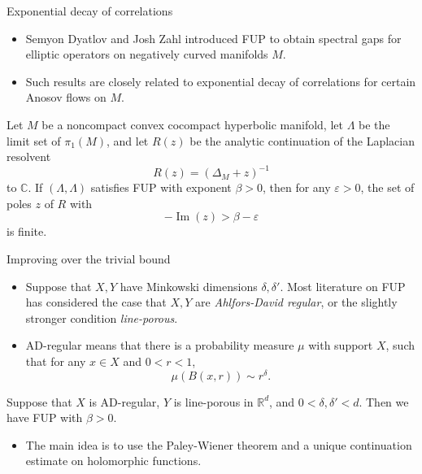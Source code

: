 \documentclass[10pt]{beamer}
\newcommand{\RR}{\mathbb{R}}
\newcommand{\CC}{\mathbb{C}}
\renewcommand{\Im}{\operatorname{Im}}
\begin{document}
\begin{frame}{Exponential decay of correlations}
\begin{itemize}
\item Semyon Dyatlov and Josh Zahl introduced FUP to obtain spectral gaps for elliptic operators on negatively curved manifolds $M$. \pause
\item Such results are closely related to exponential decay of correlations for certain Anosov flows on $M$. \pause
\end{itemize}

\begin{theorem}
Let $M$ be a noncompact convex cocompact hyperbolic manifold, let $\Lambda$ be the limit set of $\pi_1(M)$, and let $R(z)$ be the analytic continuation of the Laplacian resolvent
$$R(z) = (\Delta_M + z)^{-1}$$
to $\CC$. If $(\Lambda, \Lambda)$ satisfies FUP with exponent $\beta > 0$, then for any $\varepsilon > 0$, the set of poles $z$ of $R$ with
$$-\Im(z) > \beta - \varepsilon$$
is finite.
\end{theorem}
\end{frame}

\begin{frame}{Improving over the trivial bound}
\begin{itemize}
\item Suppose that $X, Y$ have Minkowski dimensions $\delta, \delta'$. Most literature on FUP has considered the case that $X, Y$ are \emph{Ahlfors-David regular}, or the slightly stronger condition \emph{line-porous}. \pause
\item AD-regular means that there is a probability measure $\mu$ with support $X$, such that for any $x \in X$ and $0 < r < 1$,
$$\mu(B(x, r)) \sim r^\delta.$$ \pause
\end{itemize}

\begin{theorem}
Suppose that $X$ is AD-regular, $Y$ is line-porous in $\RR^d$, and $0 < \delta, \delta' < d$. Then we have FUP with $\beta > 0$.
\end{theorem} \pause 

\begin{itemize}
\item The main idea is to use the Paley-Wiener theorem and a unique continuation estimate on holomorphic functions.
\end{itemize}
\end{frame}
\end{document}

